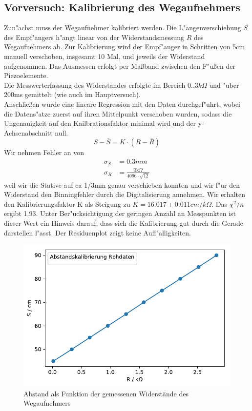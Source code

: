 \documentclass[12pt,a4paper]{article}
\begin{document}
\subsection{Vorversuch: Kalibrierung des Wegaufnehmers}
Zun"achst muss der Wegaufnehmer kalibriert werden. Die L"angenverschiebung $S$ des Empf"angers h"angt linear von der Widerstandsmessung $R$ des Wegaufnehmers ab. Zur Kalibrierung wird der Empf"anger in Schritten von 5cm manuell verschoben, insgesamt 10 Mal, und jeweils der Widerstand aufgenommen. Das Ausmessen erfolgt per Ma\ss band zwischen den F"u\ss en der Piezoelemente.\\
Die Messwerterfassung des Widerstandes erfolgte im Bereich $0..3k\Omega$ und "uber 200ms gemittelt (wie auch im Hauptversuch).\\
Anschlie\ss en wurde eine lineare Regression mit den Daten durchgef"uhrt, wobei die Datens"atze zuerst auf ihren Mittelpunkt verschoben wurden, sodass die Ungenauigkeit auf den Kailbrationsfaktor minimal wird und der y-Achsenabschnitt null.
\begin{equation}
S-\bar{S}=K\cdot(R-\bar{R})
\end{equation}
Wir nehmen Fehler an von 
\begin{align}
\sigma_S &=0.3mm\\
\sigma_R &= \frac{3\text{k}\Omega}{4096\cdot\sqrt{12}}
\end{align}
weil wir die Stative auf ca 1/3mm genau verschieben konnten und wir f"ur den Widerstand den Binningfehler durch die Digitalisierung annehmen.
Wir erhalten den Kalibrierungsfaktor K als Steigung zu $K=16.017\pm0.011cm/k\Omega$. Das $\chi^2/n$ ergibt 1.93. Unter Ber"ucksichtigung der geringen Anzahl an Messpunkten ist dieser Wert ein Hinweis darauf, dass sich die Kalibrierung gut durch die Gerade darstellen l"asst. Der Residuenplot zeigt keine Auff"alligkeiten.
\begin{figure}[H]
	\centering
	\includegraphics[scale=0.7]{Python/WegaufKal_Rohdaten.pdf}
	\caption{Abstand als Funktion der gemessenen Widerstände des Wegaufnehmers}
	\label{Abstandskal_Rohdaten}
\end{figure}
\end{document}
